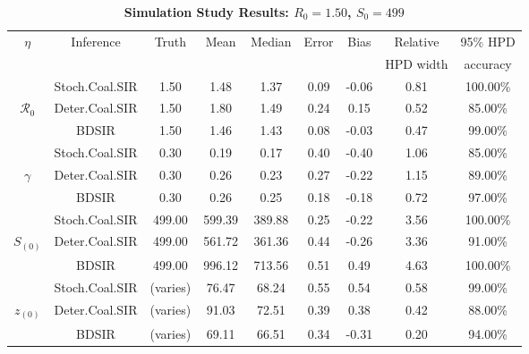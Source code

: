 \documentclass[12pt,titlepage]{article}
\newcommand{\BDSIR}{BDSIR}
\begin{document}
%
\begin{table}[!ht]
\begin{center}
\caption{
\bf{Simulation Study Results:  $R_{0}=1.50$, $S_{0}=499$}}
\label{table:simStudy}
\begin{tabular}{|c|c|c|c|c|c|c|c|c|}
\hline
$\eta$ & Inference & Truth & Mean & Median & Error & Bias & Relative & 95\% HPD \\ 
&  &  &  &  &  &  &  HPD width & accuracy \\ 
	\hline
	\hline
& Stoch.Coal.SIR & 1.50 & 1.48 & 1.37 & 0.09 & -0.06 & 0.81 & 100.00\% \\
$\mathcal{R}_0$ & Deter.Coal.SIR & 1.50 & 1.80 & 1.49 & 0.24 & 0.15 & 0.52 & 85.00\% \\
& \BDSIR{} & 1.50 & 1.46 & 1.43 & 0.08 & -0.03 & 0.47 & 99.00\% \\ 
   \hline
   \hline 
& Stoch.Coal.SIR & 0.30 & 0.19 & 0.17 & 0.40 & -0.40 & 1.06 & 85.00\% \\
$\gamma$ & Deter.Coal.SIR  & 0.30 & 0.26 & 0.23 & 0.27 & -0.22 & 1.15 & 89.00\% \\
& \BDSIR{} & 0.30 & 0.26 & 0.25 & 0.18 & -0.18 & 0.72 & 97.00\% \\ 
   \hline
   \hline
& Stoch.Coal.SIR & 499.00 & 599.39 & 389.88 & 0.25 & -0.22 & 3.56 & 100.00\% \\
$S_{(0)}$ & Deter.Coal.SIR & 499.00 & 561.72 & 361.36 & 0.44 & -0.26 & 3.36 & 91.00\% \\
& \BDSIR{} & 499.00 & 996.12 & 713.56 & 0.51 & 0.49 & 4.63 & 100.00\% \\ 
   \hline
   \hline
& Stoch.Coal.SIR & (varies) & 76.47 & 68.24 & 0.55 & 0.54 & 0.58 & 99.00\% \\
$z_{(0)}$ & Deter.Coal.SIR & (varies) & 91.03 & 72.51 & 0.39 & 0.38 & 0.42 & 88.00\% \\
& \BDSIR{} & (varies) & 69.11 & 66.51 & 0.34 & -0.31 & 0.20 & 94.00\% \\  
   \hline
\end{tabular}
\end{center}
\end{table}
%
\end{document}
